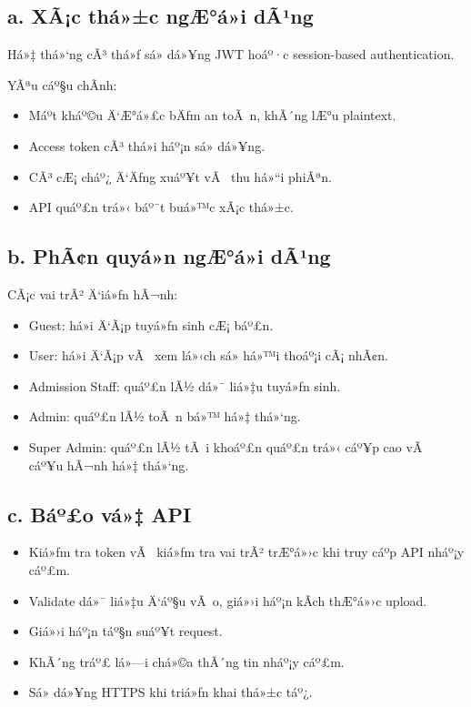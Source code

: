 ﻿\documentclass[12pt,a4paper]{report}
\begin{document}
\subsection*{a. XÃ¡c thá»±c ngÆ°á»i dÃ¹ng}

Há»‡ thá»‘ng cÃ³ thá»ƒ sá»­ dá»¥ng JWT hoáº·c session-based authentication.

YÃªu cáº§u chÃ­nh:
\begin{itemize}
    \item Máº­t kháº©u Ä‘Æ°á»£c bÄƒm an toÃ n, khÃ´ng lÆ°u plaintext.
    \item Access token cÃ³ thá»i háº¡n sá»­ dá»¥ng.
    \item CÃ³ cÆ¡ cháº¿ Ä‘Äƒng xuáº¥t vÃ  thu há»“i phiÃªn.
    \item API quáº£n trá»‹ báº¯t buá»™c xÃ¡c thá»±c.
\end{itemize}

\subsection*{b. PhÃ¢n quyá»n ngÆ°á»i dÃ¹ng}

CÃ¡c vai trÃ² Ä‘iá»ƒn hÃ¬nh:
\begin{itemize}
    \item Guest: há»i Ä‘Ã¡p tuyá»ƒn sinh cÆ¡ báº£n.
    \item User: há»i Ä‘Ã¡p vÃ  xem lá»‹ch sá»­ há»™i thoáº¡i cÃ¡ nhÃ¢n.
    \item Admission Staff: quáº£n lÃ½ dá»¯ liá»‡u tuyá»ƒn sinh.
    \item Admin: quáº£n lÃ½ toÃ n bá»™ há»‡ thá»‘ng.
    \item Super Admin: quáº£n lÃ½ tÃ i khoáº£n quáº£n trá»‹ cáº¥p cao vÃ  cáº¥u hÃ¬nh há»‡ thá»‘ng.
\end{itemize}

\subsection*{c. Báº£o vá»‡ API}

\begin{itemize}
    \item Kiá»ƒm tra token vÃ  kiá»ƒm tra vai trÃ² trÆ°á»›c khi truy cáº­p API nháº¡y cáº£m.
    \item Validate dá»¯ liá»‡u Ä‘áº§u vÃ o, giá»›i háº¡n kÃ­ch thÆ°á»›c upload.
    \item Giá»›i háº¡n táº§n suáº¥t request.
    \item KhÃ´ng tráº£ lá»—i chá»©a thÃ´ng tin nháº¡y cáº£m.
    \item Sá»­ dá»¥ng HTTPS khi triá»ƒn khai thá»±c táº¿.
\end{itemize}
\end{document}
